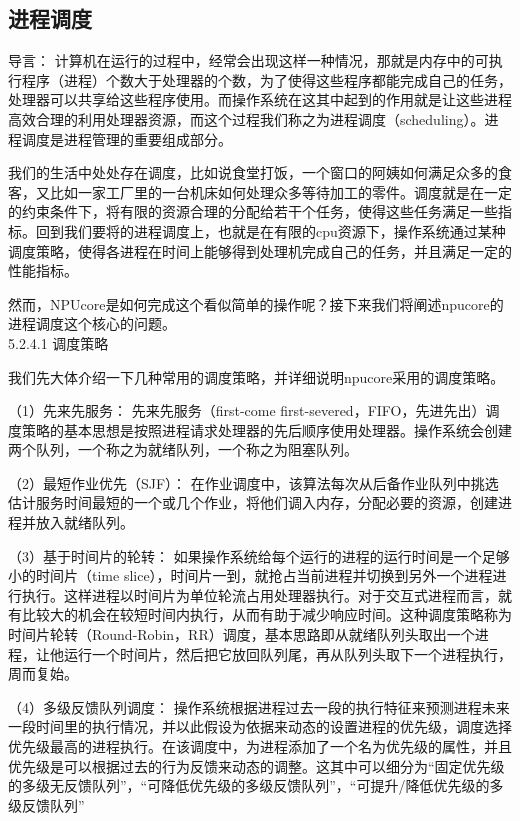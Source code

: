 \subsection{进程调度}
导言：
计算机在运行的过程中，经常会出现这样一种情况，那就是内存中的可执行程序（进程）个数大于处理器的个数，为了使得这些程序都能完成自己的任务，处理器可以共享给这些程序使用。而操作系统在这其中起到的作用就是让这些进程高效合理的利用处理器资源，而这个过程我们称之为进程调度（scheduling）。进程调度是进程管理的重要组成部分。

我们的生活中处处存在调度，比如说食堂打饭，一个窗口的阿姨如何满足众多的食客，又比如一家工厂里的一台机床如何处理众多等待加工的零件。调度就是在一定的约束条件下，将有限的资源合理的分配给若干个任务，使得这些任务满足一些指标。回到我们要将的进程调度上，也就是在有限的cpu资源下，操作系统通过某种调度策略，使得各进程在时间上能够得到处理机完成自己的任务，并且满足一定的性能指标。

然而，NPUcore是如何完成这个看似简单的操作呢？接下来我们将阐述npucore的进程调度这个核心的问题。
\\[10pt]
5.2.4.1 调度策略

我们先大体介绍一下几种常用的调度策略，并详细说明npucore采用的调度策略。

（1）先来先服务：
先来先服务（first-come first-severed，FIFO，先进先出）调度策略的基本思想是按照进程请求处理器的先后顺序使用处理器。操作系统会创建两个队列，一个称之为就绪队列，一个称之为阻塞队列。

（2）最短作业优先（SJF）：
在作业调度中，该算法每次从后备作业队列中挑选估计服务时间最短的一个或几个作业，将他们调入内存，分配必要的资源，创建进程并放入就绪队列。

（3）基于时间片的轮转：
如果操作系统给每个运行的进程的运行时间是一个足够小的时间片（time slice），时间片一到，就抢占当前进程并切换到另外一个进程进行执行。这样进程以时间片为单位轮流占用处理器执行。对于交互式进程而言，就有比较大的机会在较短时间内执行，从而有助于减少响应时间。这种调度策略称为时间片轮转（Round-Robin，RR）调度，基本思路即从就绪队列头取出一个进程，让他运行一个时间片，然后把它放回队列尾，再从队列头取下一个进程执行，周而复始。

（4）多级反馈队列调度：
操作系统根据进程过去一段的执行特征来预测进程未来一段时间里的执行情况，并以此假设为依据来动态的设置进程的优先级，调度选择优先级最高的进程执行。在该调度中，为进程添加了一个名为优先级的属性，并且优先级是可以根据过去的行为反馈来动态的调整。这其中可以细分为“固定优先级的多级无反馈队列”，“可降低优先级的多级反馈队列”，“可提升/降低优先级的多级反馈队列”

